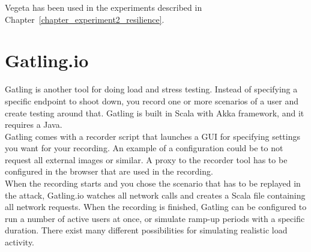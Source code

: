 \noindent Vegeta has been used in the experiments described in Chapter~\ref{chapter_experiment2_resilience}.

\section*{Gatling.io}
Gatling is another tool for doing load and stress testing. Instead of specifying a specific endpoint to shoot down, you record one or more scenarios of a user and create testing around that. Gatling is built in Scala with Akka framework, and it requires a Java.\\

\noindent Gatling comes with a recorder script that launches a GUI for specifying settings you want for your recording. An example of a configuration could be to not request all external images or similar. A proxy to the recorder tool has to be configured in the browser that are used in the recording. \\

\noindent When the recording starts and you chose the scenario that has to be replayed in the attack, Gatling.io watches all network calls and creates a Scala file containing all network requests. When the recording is finished, Gatling can be configured to run a number of active users at once, or simulate ramp-up periods with a specific duration. There exist many different possibilities for simulating realistic load activity.


